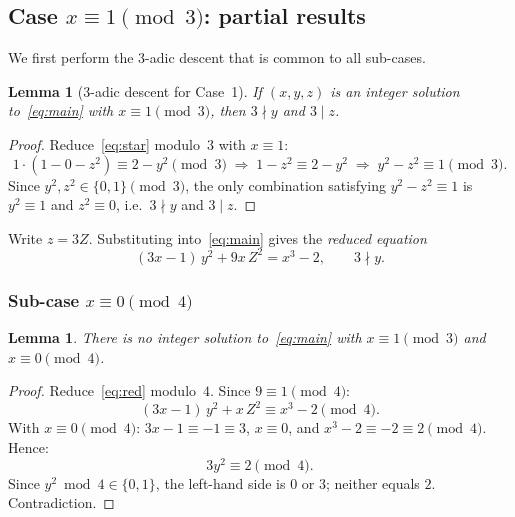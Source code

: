 \documentclass[12pt,a4paper]{article}
\newtheorem{lemma}[theorem]{Lemma}
\theoremstyle{definition}
\begin{document}
\subsection{Case \texorpdfstring{$x \equiv 1 \pmod{3}$}{x ≡ 1 (mod 3)}: partial results}
\label{sec:case1}

We first perform the 3-adic descent that is common to all sub-cases.

\begin{lemma}[3-adic descent for Case~1]\label{lem:descent1}
  If $(x,y,z)$ is an integer solution to~\eqref{eq:main} with
  $x \equiv 1 \pmod{3}$, then $3 \nmid y$ and $3 \mid z$.
\end{lemma}

\begin{proof}
  Reduce~\eqref{eq:star} modulo~$3$ with $x \equiv 1$:
  \[
    1 \cdot (1 - 0 - z^2) \equiv 2 - y^2 \pmod{3}
    \;\Longrightarrow\;
    1 - z^2 \equiv 2 - y^2
    \;\Longrightarrow\;
    y^2 - z^2 \equiv 1 \pmod{3}.
  \]
  Since $y^2, z^2 \in \{0,1\} \pmod{3}$, the only combination satisfying
  $y^2 - z^2 \equiv 1$ is $y^2 \equiv 1$ and $z^2 \equiv 0$, i.e.\
  $3 \nmid y$ and $3 \mid z$.
\end{proof}

\noindent
Write $z = 3Z$.  Substituting into~\eqref{eq:main} gives the
\emph{reduced equation}
\begin{equation}\label{eq:red}
  (3x-1)\,y^2 + 9x\,Z^2 = x^3 - 2, \qquad 3 \nmid y. \tag{$\star$}
\end{equation}

\subsubsection{Sub-case \texorpdfstring{$x \equiv 0 \pmod{4}$}{x ≡ 0 (mod 4)}}

\begin{lemma}\label{lem:case1a}
  There is no integer solution to~\eqref{eq:main} with
  $x \equiv 1 \pmod{3}$ and $x \equiv 0 \pmod{4}$.
\end{lemma}

\begin{proof}
  Reduce~\eqref{eq:red} modulo~$4$.
  Since $9 \equiv 1 \pmod{4}$:
  \[
    (3x-1)\,y^2 + x\,Z^2 \equiv x^3 - 2 \pmod{4}.
  \]
  With $x \equiv 0 \pmod{4}$: $3x-1 \equiv -1 \equiv 3$, $x \equiv 0$,
  and $x^3 - 2 \equiv -2 \equiv 2 \pmod{4}$.  Hence:
  \[
    3y^2 \equiv 2 \pmod{4}.
  \]
  Since $y^2 \bmod 4 \in \{0,1\}$, the left-hand side is $0$ or $3$;
  neither equals $2$.  Contradiction.
\end{proof}
\end{document}
